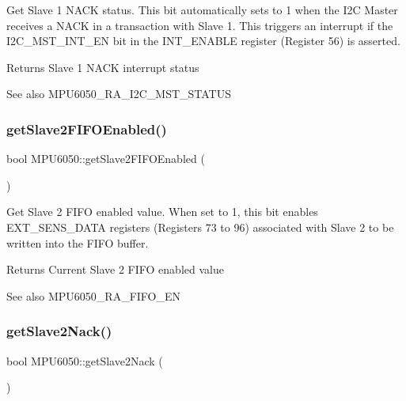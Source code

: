 Get Slave 1 N\+A\+CK status. This bit automatically sets to 1 when the I2C Master receives a N\+A\+CK in a transaction with Slave 1. This triggers an interrupt if the I2\+C\+\_\+\+M\+S\+T\+\_\+\+I\+N\+T\+\_\+\+EN bit in the I\+N\+T\+\_\+\+E\+N\+A\+B\+LE register (Register 56) is asserted. \begin{DoxyReturn}{Returns}
Slave 1 N\+A\+CK interrupt status 
\end{DoxyReturn}
\begin{DoxySeeAlso}{See also}
M\+P\+U6050\+\_\+\+R\+A\+\_\+\+I2\+C\+\_\+\+M\+S\+T\+\_\+\+S\+T\+A\+T\+US 
\end{DoxySeeAlso}
\mbox{\label{class_m_p_u6050_a3c2e29508607a655221a2fa4f4219b4d}} 
\subsubsection{\texorpdfstring{getSlave2FIFOEnabled()}{getSlave2FIFOEnabled()}}
{\footnotesize\ttfamily bool M\+P\+U6050\+::get\+Slave2\+F\+I\+F\+O\+Enabled (\begin{DoxyParamCaption}{ }\end{DoxyParamCaption})}

Get Slave 2 F\+I\+FO enabled value. When set to 1, this bit enables E\+X\+T\+\_\+\+S\+E\+N\+S\+\_\+\+D\+A\+TA registers (Registers 73 to 96) associated with Slave 2 to be written into the F\+I\+FO buffer. \begin{DoxyReturn}{Returns}
Current Slave 2 F\+I\+FO enabled value 
\end{DoxyReturn}
\begin{DoxySeeAlso}{See also}
M\+P\+U6050\+\_\+\+R\+A\+\_\+\+F\+I\+F\+O\+\_\+\+EN 
\end{DoxySeeAlso}
\mbox{\label{class_m_p_u6050_af4b5101dab501d6df2e0cae909120771}} 
\subsubsection{\texorpdfstring{getSlave2Nack()}{getSlave2Nack()}}
{\footnotesize\ttfamily bool M\+P\+U6050\+::get\+Slave2\+Nack (\begin{DoxyParamCaption}{ }\end{DoxyParamCaption})}


